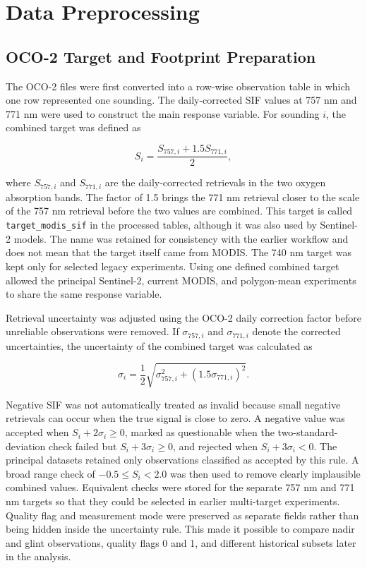 \section{Data Preprocessing\label{sec:data_preprocessing}}

\subsection{OCO-2 Target and Footprint Preparation}

The OCO-2 files were first converted into a row-wise observation table in which one row represented one sounding. The daily-corrected SIF values at 757 nm and 771 nm were used to construct the main response variable. For sounding $i$, the combined target was defined as

\begin{equation}
    S_i = \frac{S_{757,i}+1.5S_{771,i}}{2},
    \label{eq:combined_sif_target}
\end{equation}

where $S_{757,i}$ and $S_{771,i}$ are the daily-corrected retrievals in the two oxygen absorption bands. The factor of 1.5 brings the 771 nm retrieval closer to the scale of the 757 nm retrieval before the two values are combined. This target is called \texttt{target\_modis\_sif} in the processed tables, although it was also used by Sentinel-2 models. The name was retained for consistency with the earlier workflow and does not mean that the target itself came from MODIS. The 740 nm target was kept only for selected legacy experiments. Using one defined combined target allowed the principal Sentinel-2, current MODIS, and polygon-mean experiments to share the same response variable.

Retrieval uncertainty was adjusted using the OCO-2 daily correction factor before unreliable observations were removed. If $\sigma_{757,i}$ and $\sigma_{771,i}$ denote the corrected uncertainties, the uncertainty of the combined target was calculated as

\begin{equation}
    \sigma_i = \frac{1}{2}
    \sqrt{\sigma_{757,i}^{2}+\left(1.5\sigma_{771,i}\right)^{2}}.
    \label{eq:combined_sif_uncertainty}
\end{equation}

Negative SIF was not automatically treated as invalid because small negative retrievals can occur when the true signal is close to zero. A negative value was accepted when $S_i+2\sigma_i\geq0$, marked as questionable when the two-standard-deviation check failed but $S_i+3\sigma_i\geq0$, and rejected when $S_i+3\sigma_i<0$. The principal datasets retained only observations classified as accepted by this rule. A broad range check of $-0.5\leq S_i<2.0$ was then used to remove clearly implausible combined values. Equivalent checks were stored for the separate 757 nm and 771 nm targets so that they could be selected in earlier multi-target experiments. Quality flag and measurement mode were preserved as separate fields rather than being hidden inside the uncertainty rule. This made it possible to compare nadir and glint observations, quality flags 0 and 1, and different historical subsets later in the analysis.

